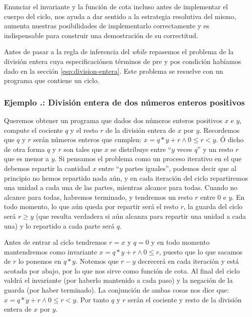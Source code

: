\documentclass[12pt, a4paper, openany, fleqn]{book}
\newcounter{example}[chapter]
\renewcommand{\theexample}{\thechapter.\arabic{example}}
\newcommand{\example}[1]{
  \refstepcounter{example} %
  \subsubsection*{Ejemplo \theexample: #1}
}
\begin{document}
    Enunciar el invariante y la función de cota incluso antes de implementar el cuerpo del ciclo, nos ayuda a dar sentido a la estrategia resolutiva del mismo, aumenta nuestras posibilidades de implementarlo correctamente y es indispensable para construir una demostración de su correctitud.

    Antes de pasar a la regla de inferencia del \textit{while} repasemos el problema de la división entera cuya especificaciónen términos de pre y pos condición habíamos dado en la sección \ref{esp:division-entera}. Este problema se resuelve con un programa que contiene un ciclo.

    \example{División entera de dos números enteros positivos}

    Queremos obtener un programa que dados dos números enteros positivos $x$ e $y$, compute el cociente $q$ y el resto $r$ de la división entera de $x$ por $y$.
    Recordemos que $q$ y $r$ serán números enteros que cumplen:
    $x = q * y + r \land 0 \leqslant r < y$.
    Ó dicho de otra forma $q$ y $r$ son tales que $x$ se distribuye entre ``$y$ veces $q$'' y un resto $r$ que es menor a $y$.
    Si pensamos el problema como un proceso iterativo en el que debemos repartir la cantidad $x$ entre ``$y$ partes iguales'', podemos decir que al principio no hemos repartido nada aún, y en cada iteración del ciclo repartiremos una unidad a cada una de las partes, mientras alcance para todas. Cuando no alcance para todas, habremos terminado, y tendremos un resto $r$ entre 0 e $y$. En todo momento, lo que aún queda por repartir será el resto $r$, la guarda del ciclo será $r \geqslant y$ (que resulta verdadera si aún alcanza para repartir una unidad a cada una) y lo repartido a cada parte será $q$.

    Antes de entrar al ciclo tendremos $r=x$ y $q=0$ y en todo momento mantendremos como invariante $x = q * y + r \land 0 \leqslant r$, puesto que lo que sacamos de $r$ lo ponemos en $q * y$. Notemos que $r - y$ decrecerá en cada iteración y está acotada por abajo, por lo que nos sirve como función de cota.
    Al final del ciclo valdrá el invariante (por haberlo mantenido a cada paso) y la negación de la guarda (por haber terminado). La conjunción de ambas cosas nos dice que: $x = q * y + r \land 0 \leqslant r < y$. Por tanto $q$ y $r$ serán el cociente y resto de la división entera de $x$ por $y$.
\end{document}
